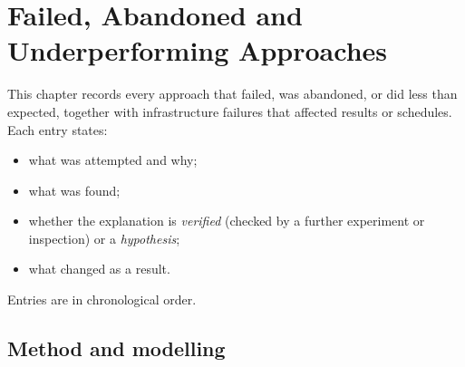 \chapter{Failed, Abandoned and Underperforming Approaches}\label{ch:failures}

This chapter records every approach that failed, was abandoned, or did less than expected, together with
infrastructure failures that affected results or schedules. Each entry states:
\begin{itemize}
\item what was attempted and why;
\item what was found;
\item whether the explanation is \emph{verified} (checked by a further experiment or inspection) or a
\emph{hypothesis};
\item what changed as a result.
\end{itemize}
Entries are in chronological order.

\section{Method and modelling}

